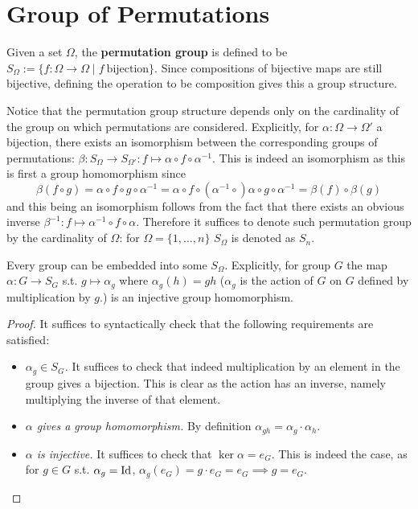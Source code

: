 \documentclass{article}
\begin{document}
\section{Group of Permutations}

\begin{definition}
    Given a set $\Omega$, the \textbf{permutation group} is defined to be $S_{\Omega} := \{f: \Omega \to \Omega \mid f\ \text{bijection}\}$. Since compositions of bijective maps are still bijective, defining the operation to be composition gives this a group structure.
\end{definition}

\begin{remark}
    Notice that the permutation group structure depends only on the cardinality of the group on which permutations are considered. Explicitly, for $\alpha: \Omega \to \Omega'$ a bijection, there exists an isomorphism between the corresponding groups of permutations: $\beta: S_{\Omega} \to S_{\Omega'}: f \mapsto \alpha \circ f \circ \alpha^{-1}$. This is indeed an isomorphism as this is first a group homomorphism since
    \[
        \beta(f \circ g) = \alpha \circ f \circ g \circ \alpha^{-1} = \alpha \circ f \circ (\alpha^{-1} \circ) \alpha \circ g \circ \alpha^{-1} = \beta(f) \circ \beta(g)
    \]
    and this being an isomorphism follows from the fact that there exists an obvious inverse $\beta^{-1}: f \mapsto \alpha^{-1} \circ f \circ \alpha$. Therefore it suffices to denote such permutation group by the cardinality of $\Omega$: for $\Omega = \{1, \dots, n\}$ $S_{\Omega}$ is denoted as $S_n$.
\end{remark}

\begin{proposition}[Cayley]
    Every group can be embedded into some $S_{\Omega}$. Explicitly, for group $G$ the map $\alpha: G \to S_G$ s.t. $g \mapsto \alpha_g$ where $\alpha_g(h) = gh$ ($\alpha_g$ is the action of $G$ on $G$ defined by multiplication by $g$.) is an injective group homomorphism.
\end{proposition}

\begin{proof}
    It suffices to syntactically check that the following requirements are satisfied:
    \begin{itemize}
        \item \emph{$\alpha_g \in S_G$.} It suffices to check that indeed multiplication by an element in the group gives a bijection. This is clear as the action has an inverse, namely multiplying the inverse of that element. 
        \item \emph{$\alpha$ gives a group homomorphism.} By definition $\alpha_{gh} = \alpha_g \cdot \alpha_h$.
        \item \emph{$\alpha$ is injective.} It suffices to check that $\ker \alpha = e_G$. This is indeed the case, as for $g \in G$ s.t. $\alpha_g = \mathrm{Id}$, $\alpha_g(e_G) = g \cdot e_G = e_G \implies g = e_G$.
    \end{itemize}
\end{proof}
\end{document}
